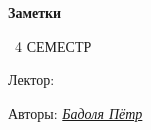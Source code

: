 \begin{titlepage}
	\clearpage\thispagestyle{empty}
	\centering
	
	\textbf{Заметки}
	\vspace{33ex}
	
	{\textbf{\FullCourseNameFirstPart}}
	
	\SemesterNumber\ 4 СЕМЕСТР
	\vspace{1ex}
	
	Лектор: \textit{\LecturerInitials}
	

	\begin{flushright}
		\noindent
		Авторы:
    \href{https://vk.com/akzium}{\textit{Бадоля Пётр}}
    
	\end{flushright}
	
	\vfill
	\CourseDate
	\pagebreak
\end{titlepage}